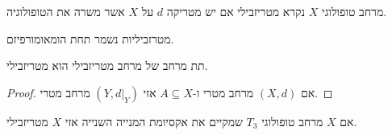 \documentclass{tstextbook}
\begin{document}
\begin{definition}
מרחב טופולוגי \(X\) נקרא מטריזבילי אם יש מטריקה \(d\) על \(X\) אשר משרה את הטופולוגיה.

\end{definition}
\begin{proposition}
מטרזביליות נשמר תחת הומאומורפיזם.

\end{proposition}
\begin{proposition}
תת מרחב של מרחב מטריזבילי הוא מטריזבילי.

\end{proposition}
\begin{proof}
אם \((X,d)\) מרחב מטרי ו-\(A\subseteq X\) אזי \((Y,d|_{Y})\) מרחב מטרי.

\end{proof}
\begin{theorem}
אם \(X\) מרחב טופולוגי \(T_{3}\) שמקיים את אקסיומת המנייה השנייה אזי \(X\) מטריזבילי.

\end{theorem}
\end{document}
